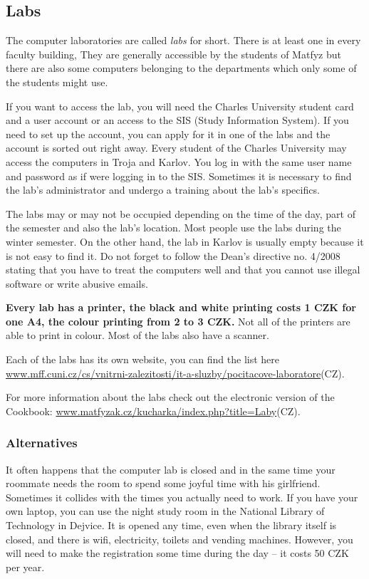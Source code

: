 \subsection{Labs}
The computer laboratories are called \textit{labs} for short. There is at least
one in every faculty building, They are generally accessible by the students of
Matfyz but there are also some computers belonging to the departments which only
some of the students might use.

If you want to access the lab, you will need the Charles University student card
and a user account or an access to the SIS (Study Information System).
If you need to set up the account, you can apply for it in one of the labs and
the account is sorted out right away.
Every student of the Charles University may access the computers in Troja and
Karlov. You log in with the same user name and password as if were logging in to
the SIS.
Sometimes it is necessary to find the lab's administrator and undergo a training
about the lab's specifics.

The labs may or may not be occupied depending on the time of the day, part of
the semester and also the lab's location. Most people use the labs during the
winter semester.
On the other hand, the lab in Karlov is usually empty because it is not easy to
find it. Do not forget to follow the Dean's directive no. 4/2008 stating that
you have to treat the computers well and that you cannot use illegal software or
write abusive emails.

\textbf{Every lab has a printer, the black and white printing costs 1 CZK for
one A4, the colour printing from 2 to 3 CZK.} Not all of the printers are able
to print in colour.
Most of the labs also have a scanner.

Each of the labs has its own website, you can find the list here
\url{www.mff.cuni.cz/cs/vnitrni-zalezitosti/it-a-sluzby/pocitacove-laboratore}(CZ).

For more information about the labs check out the electronic version of the
Cookbook:
\url{www.matfyzak.cz/kucharka/index.php?title=Laby}(CZ).



\subsubsection{Alternatives}
It often happens that the computer lab is closed and in the same time your
roommate needs the room to spend some joyful time with his girlfriend. Sometimes
it collides with the times you actually need to work.
If you have your own laptop, you can use the night study room in the National
Library of Technology in Dejvice. It is opened any time, even when the library
itself is closed, and there is wifi, electricity, toilets and vending machines.
However, you will need to make the registration some time during the day -- it
costs 50 CZK per year.